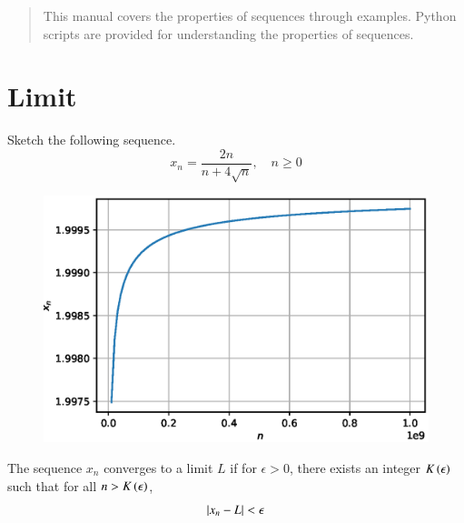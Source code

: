 \documentclass[journal,12pt,twocolumn]{IEEEtran}
\begin{document}
%
\IEEEpeerreviewmaketitle

\bigskip

\begin{abstract}
This manual covers the properties of sequences through examples.  Python scripts are provided for understanding the properties of sequences.
\end{abstract}
%

\section{Limit}
\begin{problem}
Sketch the following sequence.
\begin{equation}
\label{eq:seq_converge}
x_n = \frac{2n}{n+4\sqrt{n}}, \quad n \ge 0
\end{equation}
\end{problem}
%
\solution
%

%
\begin{figure}[!ht]
\begin{center}
\includegraphics[width=\columnwidth]{./figs/seq_converge.eps}
\end{center}
\label{fig:seq_converge}	
\end{figure}
%
\begin{definition}
\label{def:seq_converge}
The sequence $x_n$ converges to a limit $L$ if for $\epsilon > 0$, there exists an integer $K\left(\epsilon\right) $ such that for all $n > K\left(\epsilon\right)$,
%
\begin{align}
\left\vert x_n - L\right\vert < \epsilon
\end{align}
%
\end{definition}
\end{document}
